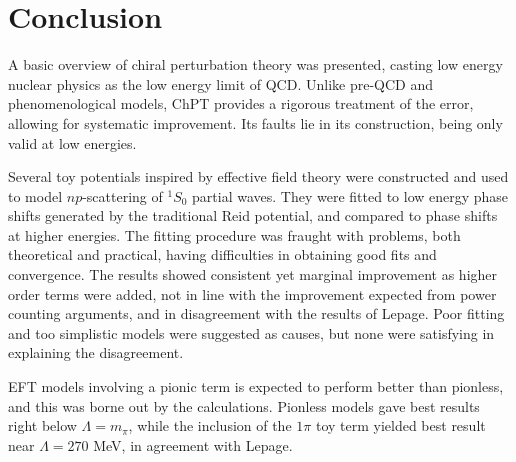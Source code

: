 \section{Conclusion}\label{sec:Conclusion}

A basic overview of chiral perturbation theory was presented, casting low energy
nuclear physics as the low energy limit of QCD. Unlike pre-QCD and
phenomenological models, ChPT provides a rigorous treatment of the error, allowing
for systematic improvement. Its
faults lie in its construction, being only valid at low energies.

Several toy potentials inspired by effective field theory were constructed and used to model
\(np\)-scattering of \(^{1}S_{0}\) partial waves. They were fitted to low energy
phase shifts generated by the traditional Reid potential, and compared to phase shifts at
higher energies. The fitting procedure was fraught with problems, both
theoretical and practical, having difficulties in obtaining good fits and
convergence. The results showed consistent yet marginal improvement as higher
order terms were added, not in line with the improvement expected from power counting
arguments, and in disagreement with the results of Lepage. Poor fitting and too
simplistic models were suggested as causes, but none were satisfying in
explaining the disagreement.

EFT models involving a pionic term is expected to perform better than
pionless, and this was borne out by the calculations. Pionless models gave best
results right below \(\Lambda = m_{\pi}\), while the inclusion of the \(1\pi\)
toy term yielded best result near \(\Lambda = 270\) MeV, in agreement with
Lepage.



